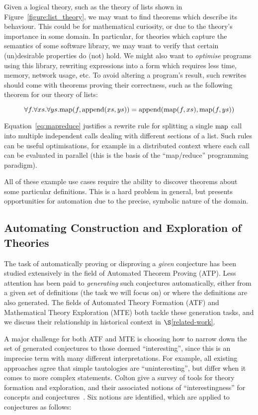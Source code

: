 Given a logical theory, such as the theory of lists shown in
Figure~\ref{figure:list_theory}, we may want to find theorems which describe its
behaviour. This could be for mathematical curiosity, or due to the theory's
importance in some domain. In particular, for theories which capture the
semantics of some software library, we may want to verify that certain
(un)desirable properties do (not) hold. We might also want to \emph{optimise}
programs using this library, rewriting expressions into a form which requires
less time, memory, network usage, etc. To avoid altering a program's result,
such rewrites should come with theorems proving their correctness, such as the
following theorem for our theory of lists:

\begin{equation} \label{eq:mapreduce}
  \forall f. \forall xs. \forall ys.
    \text{map}(f, \text{append}(xs, ys)) = \text{append}(\text{map}(f, xs), \text{map}(f, ys))
\end{equation}

Equation~\ref{eq:mapreduce} justifies a rewrite rule for splitting a single
$\text{map}$ call into multiple independent calls dealing with different sections of a
list. Such rules can be useful optimisations, for example in a distributed
context where each call can be evaluated in parallel (this is the basis of the
``map/reduce'' programming paradigm).

All of these example use cases require the ability to discover theorems about
some particular definitions. This is a hard problem in general, but presents
opportunities for automation due to the precise, symbolic nature of the domain.

\subsection{Automating Construction and Exploration of Theories}
\label{sec:te}

The task of automatically proving or disproving a \emph{given} conjecture has
been studied extensively in the field of Automated Theorem Proving (ATP). Less
attention has been paid to \emph{generating} such conjectures automatically,
either from a given set of definitions (the task we will focus on) or where the
definitions are also generated. The fields of Automated Theory Formation (ATF)
and Mathematical Theory Exploration (MTE) both tackle these generation tasks,
and we discuss their relationship in historical context in
$\S$\ref{related-work}.

A major challenge for both ATF and MTE is choosing how to narrow down
the set of generated conjectures to those deemed ``interesting'', since this is
an imprecise term with many different interpretations. For example, all existing
approaches agree that simple tautologies are ``uninteresting'', but differ when
it comes to more complex statements.  Colton \etal{} give a survey of tools for
theory formation and exploration, and their associated notions of
``interestingness'' for concepts and conjectures~\cite{colton2000notion}. Six
notions are identified, which are applied to conjectures as follows:

